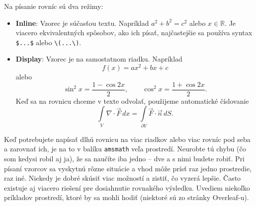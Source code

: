 Na písanie rovníc sú dva režimy:
\begin{itemize}
	\item \textbf{Inline}: Vzorec je súčasťou textu. Napríklad $a^2+b^2=c^2$ alebo \(x\in\mathbb{R}\). Je viacero ekvivalentných spôsobov, ako ich písať, najčastejšie sa používa syntax \verb|$...$| alebo \verb|\(...\)|.
	\item \textbf{Display}: Vzorec je na samostatnom riadku. Napríklad
	\begin{equation*} 
		f(x)=ax^2+bx+c
	\end{equation*}
	alebo
	\[ \sin^2x=\frac{1-\cos2x}{2}, \qquad \cos^2x=\frac{1+\cos2x}{2}. \]
	Keď sa na rovnicu chceme v texte odvolať, použijeme automatické číslovanie
	\begin{equation}\label{eq:Gauss}
		\int\limits_{V} \nabla\cdot\vec{F}\,dx = \int\limits_{\partial V} \vec{F}\cdot\vec{n}\,dS.
	\end{equation}
\end{itemize}

Keď potrebujete napísať dlhú rovnicu na viac riadkov alebo viac rovníc pod seba a zarovnať ich, je na to v balíku \verb|amsmath| veľa prostredí. Neurobte tú chybu (čo som kedysi robil aj ja), že sa naučíte iba jedno -- dve a s nimi budete robiť. Pri písaní vzorcov sa vyskytnú rôzne situácie a vhod môže prísť raz jedno prostredie, raz iné. Niekedy je dobré skúsiť viac možností a zistiť, čo vyzerá lepšie. Často existuje aj viacero riešení pre dosiahnutie rovnakého výsledku. Uvediem niekoľko príkladov prostredí, ktoré by sa mohli hodiť (niektoré sú zo stránky Overleaf-u).

